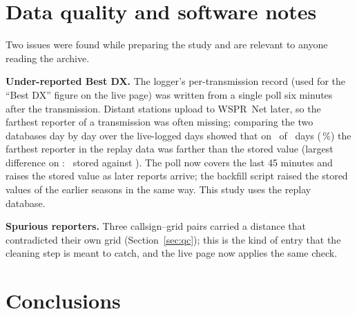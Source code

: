 \documentclass[10pt,a4paper]{article}
\begin{document}
\section{Data quality and software notes}
Two issues were found while preparing the study and are relevant to anyone reading the archive.

\textbf{Under-reported Best DX.} The logger's per-transmission record (used for the ``Best DX'' figure on the live page) was written from a single poll six minutes after the transmission. Distant stations upload to WSPR~Net later, so the farthest reporter of a transmission was often missing; comparing the two databases day by day over the live-logged days showed that on \underDays\ of \cmpDays\ days (\underPct\,\%) the farthest reporter in the replay data was farther than the stored value (largest difference on \underExDay: \underExStored\km\ stored against \underExReplay\km). The poll now covers the last 45 minutes and raises the stored value as later reports arrive; the backfill script raised the stored values of the earlier seasons in the same way. This study uses the replay database.

\textbf{Spurious reporters.} Three callsign--grid pairs carried a distance that contradicted their own grid (Section~\ref{sec:qc}); this is the kind of entry that the cleaning step is meant to catch, and the live page now applies the same check.

\section{Conclusions}
\end{document}

